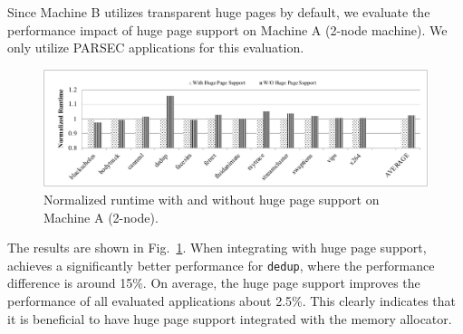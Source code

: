 Since Machine B utilizes transparent huge pages by default, we evaluate the performance impact of huge page support on Machine A (2-node machine). We only utilize PARSEC applications for this evaluation. 

\begin{figure}[!h]
    \centering
    \includegraphics[width=\textwidth]{figure/hugepage.pdf}
    \caption{Normalized runtime with and without huge page support on Machine A (2-node).}
    \label{fig:hugepage}
\end{figure}

The results are shown in Fig.~\ref{fig:hugepage}. When integrating with huge page support, \NM{} achieves a significantly better performance for \texttt{dedup}, where the performance difference is around 15\%. On average,  the huge page support improves the performance of all evaluated applications about 2.5\%. This clearly indicates that it is beneficial to have huge page support integrated with the memory allocator.  


